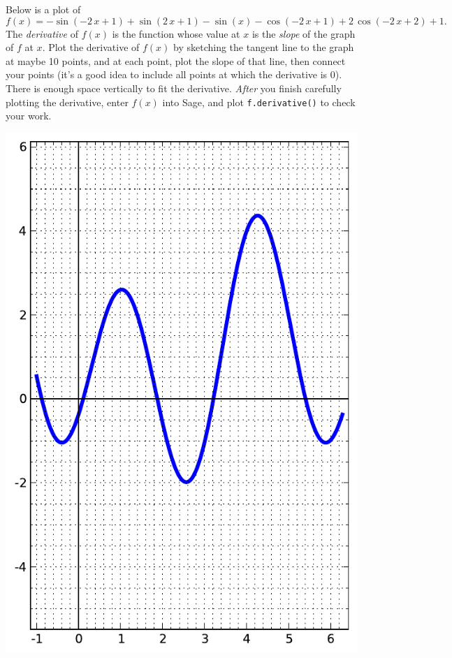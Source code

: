 Below is a plot of $$f(x)=-\sin\left(-2 \, x + 1\right) + \sin\left(2 \, x + 1\right) - \sin\left(x\right) - \cos\left(-2 \, x + 1\right) + 2 \, \cos\left(-2 \, x + 2\right) + 1.$$  The {\em \color{red}derivative} of $f(x)$ is the function whose value at $x$ is the {\em slope} of the graph of $f$ at $x$.  Plot the derivative of $f(x)$ by sketching the tangent line to the graph at maybe 10 points, and at each point, plot the slope of that line, then connect your points (it's a good idea to include all points at which the derivative is 0).  There is enough space vertically to fit the derivative.  {\em After} you finish carefully plotting the derivative, enter $f(x)$ into Sage, and plot {\color{blue}\verb|f.derivative()|} to check your work.
\begin{center}\includegraphics{functions/64.pdf}\end{center}\newpage

